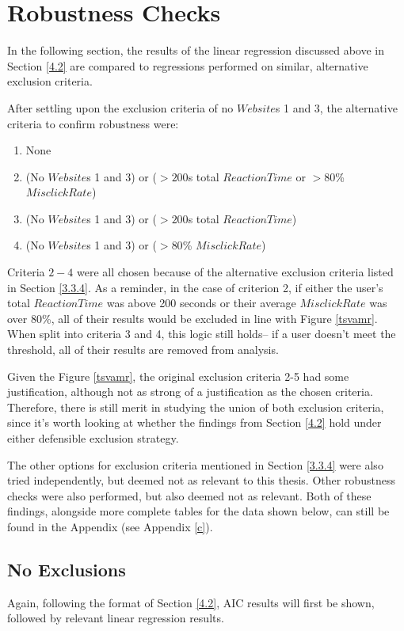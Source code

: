 \documentclass[12pt,twoside]{reedthesis}
\begin{document}
\section{Robustness Checks}\label{4.3}

    In the following section, the results of the linear regression discussed above in Section \ref{4.2} are compared to regressions performed on similar, alternative exclusion criteria. 

    After settling upon the exclusion criteria of no $Website$s 1 and 3, the alternative criteria to confirm robustness were:
    \begin{enumerate}
        \item None
        \item (No $Website$s 1 and 3) or ($>200$s total $ReactionTime$ or $>80$\% $MisclickRate$)
        \item (No $Website$s 1 and 3) or ($>200$s total $ReactionTime$)
        \item (No $Website$s 1 and 3) or ($>80$\% $MisclickRate$)
    \end{enumerate}

    Criteria $2-4$ were all chosen because of the alternative exclusion criteria listed in Section \ref{3.3.4}. As a reminder, in the case of criterion 2, if either the user's total $ReactionTime$ was above 200 seconds or their average $MisclickRate$ was over 80\%, all of their results would be excluded in line with Figure \ref{tsvamr}. When split into criteria 3 and 4, this logic still holds-- if a user doesn't meet the threshold, all of their results are removed from analysis.
    
    Given the Figure \ref{tsvamr}, the original exclusion criteria 2-5 had some justification, although not as strong of a justification as the chosen criteria. Therefore, there is still merit in studying the union of both exclusion criteria, since it's worth looking at whether the findings from Section \ref{4.2} hold under either defensible exclusion strategy.

    The other options for exclusion criteria mentioned in Section \ref{3.3.4} were also tried independently, but deemed not as relevant to this thesis. Other robustness checks were also performed, but also deemed not as relevant. Both of these findings, alongside more complete tables for the data shown below, can still be found in the Appendix (see Appendix \ref{c}).

\subsection{No Exclusions}\label{4.3.1}
    Again, following the format of Section \ref{4.2}, AIC results will first be shown, followed by relevant linear regression results.
\end{document}
